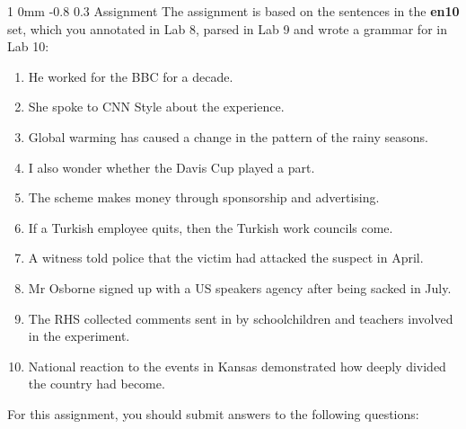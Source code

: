 \documentclass[11pt]{article}
\makeatletter
\renewcommand{\section}{\@startsection
{section}%
{1}%
{0mm}%
{-0.8\baselineskip}%
{0.3\baselineskip}%
{\bfseries\large}}%
\makeatother
\begin{document}
\section{Assignment}
\noindent
The assignment is based on the sentences in the \textbf{en10} set, which you annotated in Lab 8, parsed in Lab 9
and wrote a grammar for in Lab 10:
\begin{enumerate}[noitemsep]
\item He worked for the BBC for a decade.
\item She spoke to CNN Style about the experience.
\item Global warming has caused a change in the pattern of the rainy seasons.
\item I also wonder whether the Davis Cup played a part.
\item The scheme makes money through sponsorship and advertising.
\item If a Turkish employee quits, then the Turkish work councils come.
\item A witness told police that the victim had attacked the suspect in April.
\item Mr Osborne signed up with a US speakers agency after being sacked in July.
\item The RHS collected comments sent in by schoolchildren and teachers involved in the experiment.
\item National reaction to the events in Kansas demonstrated how deeply divided the country had become.
\end{enumerate}
For this assignment, you should submit answers to the following questions:
\end{document}
